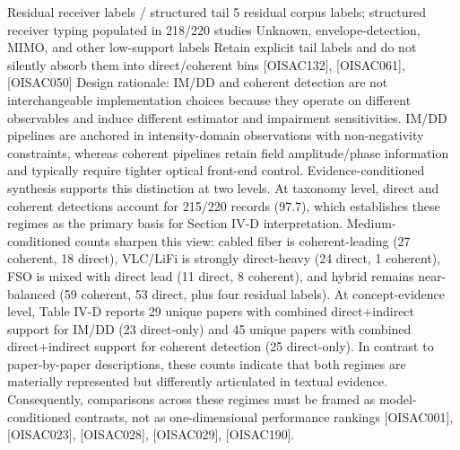 {}\markdownRendererPipe{} Residual receiver labels / structured tail \markdownRendererPipe{} 5 residual corpus labels; structured receiver typing populated in 218/220 studies \markdownRendererPipe{} Unknown, envelope-detection, MIMO, and other low-support labels \markdownRendererPipe{} Retain explicit tail labels and do not silently absorb them into direct/coherent bins \markdownRendererPipe{} [O\markdownRendererUnderscore{}ISAC\markdownRendererUnderscore{}132], [O\markdownRendererUnderscore{}ISAC\markdownRendererUnderscore{}061], [O\markdownRendererUnderscore{}ISAC\markdownRendererUnderscore{}050] \markdownRendererPipe{}\markdownRendererInterblockSeparator
{}\markdownRendererSectionBegin
{}\markdownRendererInterblockSeparator
{}Design rationale: IM/DD and coherent detection are not interchangeable implementation choices because they operate on different observables and induce different estimator and impairment sensitivities. IM/DD pipelines are anchored in intensity-domain observations with non-negativity constraints, whereas coherent pipelines retain field amplitude/phase information and typically require tighter optical front-end control.\markdownRendererParagraphSeparator
{}Evidence-conditioned synthesis supports this distinction at two levels. At taxonomy level, direct and coherent detections account for 215/220 records (97.7\markdownRendererPercentSign{}), which establishes these regimes as the primary basis for Section IV-D interpretation. Medium-conditioned counts sharpen this view: cabled fiber is coherent-leading (27 coherent, 18 direct), VLC/LiFi is strongly direct-heavy (24 direct, 1 coherent), FSO is mixed with direct lead (11 direct, 8 coherent), and hybrid remains near-balanced (59 coherent, 53 direct, plus four residual labels). At concept-evidence level, Table IV-D reports 29 unique papers with combined direct+indirect support for IM/DD (23 direct-only) and 45 unique papers with combined direct+indirect support for coherent detection (25 direct-only). In contrast to paper-by-paper descriptions, these counts indicate that both regimes are materially represented but differently articulated in textual evidence. Consequently, comparisons across these regimes must be framed as model-conditioned contrasts, not as one-dimensional performance rankings [O\markdownRendererUnderscore{}ISAC\markdownRendererUnderscore{}001], [O\markdownRendererUnderscore{}ISAC\markdownRendererUnderscore{}023], [O\markdownRendererUnderscore{}ISAC\markdownRendererUnderscore{}028], [O\markdownRendererUnderscore{}ISAC\markdownRendererUnderscore{}029], [O\markdownRendererUnderscore{}ISAC\markdownRendererUnderscore{}190].\markdownRendererParagraphSeparator
